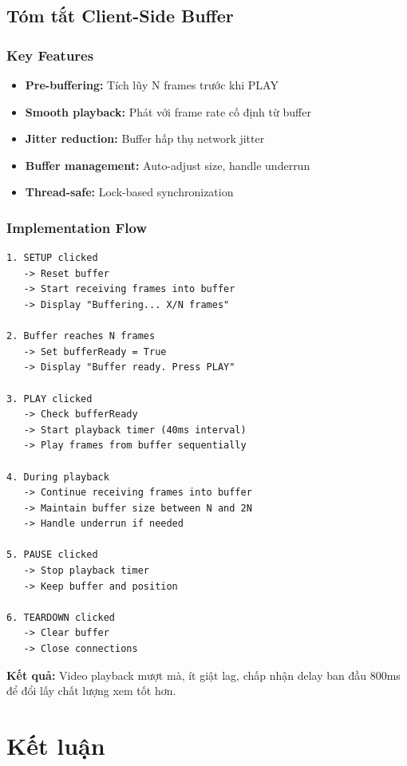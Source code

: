 \documentclass[a4paper,12pt]{article}
\begin{document}
\subsection{Tóm tắt Client-Side Buffer}

\subsubsection{Key Features}
\begin{itemize}
    \item \textbf{Pre-buffering:} Tích lũy N frames trước khi PLAY
    \item \textbf{Smooth playback:} Phát với frame rate cố định từ buffer
    \item \textbf{Jitter reduction:} Buffer hấp thụ network jitter
    \item \textbf{Buffer management:} Auto-adjust size, handle underrun
    \item \textbf{Thread-safe:} Lock-based synchronization
\end{itemize}

\subsubsection{Implementation Flow}
\begin{verbatim}
1. SETUP clicked
   -> Reset buffer
   -> Start receiving frames into buffer
   -> Display "Buffering... X/N frames"

2. Buffer reaches N frames
   -> Set bufferReady = True
   -> Display "Buffer ready. Press PLAY"

3. PLAY clicked
   -> Check bufferReady
   -> Start playback timer (40ms interval)
   -> Play frames from buffer sequentially

4. During playback
   -> Continue receiving frames into buffer
   -> Maintain buffer size between N and 2N
   -> Handle underrun if needed

5. PAUSE clicked
   -> Stop playback timer
   -> Keep buffer and position

6. TEARDOWN clicked
   -> Clear buffer
   -> Close connections
\end{verbatim}

\textbf{Kết quả:} Video playback mượt mà, ít giật lag, chấp nhận delay ban đầu 800ms để đổi lấy chất lượng xem tốt hơn.

\clearpage

\section{Kết luận}
\end{document}

